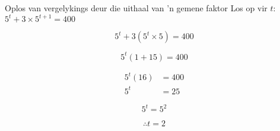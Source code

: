 \begin{wex}
{%
Oplos van vergelykings deur die uithaal van 'n gemene faktor
}
{%
Los op vir $t$: $5^t + 3 \times 5^{t+1} = 400$}
{%

\begin{equation*}
  5^t + 3 ( 5^t \times 5) = 400 
\end{equation*}

\begin{equation*}
 5^t(1 + 15) = 400 
\end{equation*}


\begin{align*}
 5^t(16) &= 400 \\
  5^t &= 25 
\end{align*}



\begin{equation*}
  5^t = 5^2 
\end{equation*}


\begin{equation*}
\therefore t = 2
\end{equation*}

}
\end{wex}

